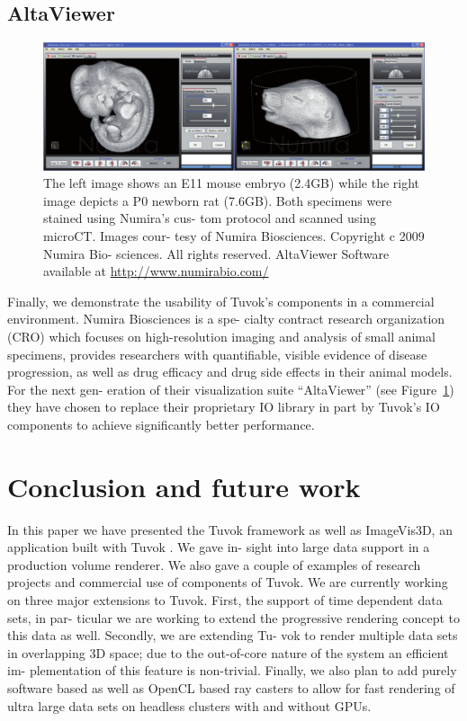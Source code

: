 \subsection{AltaViewer}

\begin{figure}
	\includegraphics[width=\linewidth]{images/arch/altaviewer}

	\caption{The left image shows an E11 mouse embryo
	(2.4GB) while the right image depicts a P0 newborn rat
	(7.6GB). Both specimens were stained using Numira’s cus-
	tom protocol and scanned using microCT. Images cour-
	tesy of Numira Biosciences. Copyright c 2009 Numira Bio-
	sciences. All rights reserved. AltaViewer Software available
	at \url{http://www.numirabio.com/}}
	\label{fig:altaviewer}
\end{figure}

Finally, we demonstrate the usability of Tuvok’s components
in a commercial environment. Numira Biosciences is a spe-
cialty contract research organization (CRO) which focuses
on high-resolution imaging and analysis of small animal
specimens, provides researchers with quantifiable, visible
evidence of disease progression, as well as drug efficacy and
drug side effects in their animal models. For the next gen-
eration of their visualization suite “AltaViewer” (see
Figure~\ref{fig:altaviewer}) they have chosen to replace their
proprietary IO library in part by Tuvok’s IO components to achieve
significantly better performance.

\section{Conclusion and future work}

In this paper we have presented the Tuvok framework as well
as ImageVis3D, an application built with Tuvok . We gave in-
sight into large data support in a production volume renderer.
We also gave a couple of examples of research projects and
commercial use of components of Tuvok.
We are currently working on three major extensions to
Tuvok. First, the support of time dependent data sets, in par-
ticular we are working to extend the progressive rendering
concept to this data as well. Secondly, we are extending Tu-
vok to render multiple data sets in overlapping 3D space;
due to the out-of-core nature of the system an efficient im-
plementation of this feature is non-trivial. Finally, we also
plan to add purely software based as well as OpenCL based
ray casters to allow for fast rendering of ultra large data sets
on headless clusters with and without GPUs.

